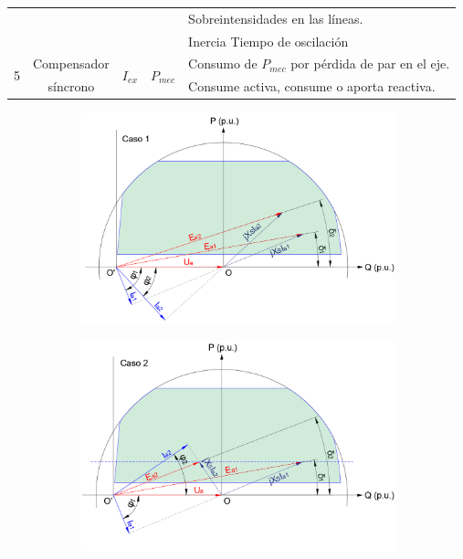 \begin{table}[H]
\begin{tabular}{ccccl}
				&              &           &   & Sobreintensidades en las líneas. \\
				&              &           &            & \textuparrow Inercia \textrightarrow \textuparrow Tiempo de oscilación\\\hline
				\multirow{2}{*}{5} & Compensador  & \multirow{2}{*}{$I_{ex}$}  & \multirow{2}{*}{$P_{mec}$}  & Consumo de $P_{mec}$ por pérdida de par en el eje. \\
				& síncrono     & 			 & 			  & Consume activa, consume o aporta reactiva.\\\hline
			\end{tabular}
			\label{tab:modosFunc}
		\end{table}
		
		\begin{figure}[H]
			\begin{minipage}{0.5\textwidth}
				\begin{figure}[H]
					\centering
					\includegraphics[width=1\linewidth]{res/tema6/modoFunc1}
					\label{fig:modofunc1}
				\end{figure}
			\end{minipage}
			\begin{minipage}{0.5\textwidth}
				\begin{figure}[H]
					\centering
					\includegraphics[width=1\linewidth]{res/tema6/modoFunc2}
					\label{fig:modofunc2}
				\end{figure}
			\end{minipage}
		\end{figure}
		
		
		
		
		
		
			